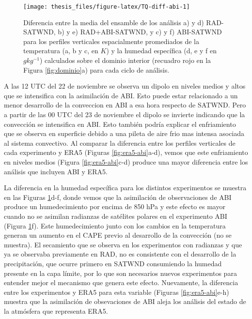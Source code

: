 \documentclass[12pt,oneside,a4paper]{reedthesis}
\begin{document}
\begin{figure}

\texttt{[image: thesis\_files/figure-latex/TQ-diff-abi-1]} \hfill{}

\caption{Diferencia entre la media del ensamble de los análisis a) y d) RAD-SATWND, b) y e) RAD+ABI-SATWND, y c) y f) ABI-SATWND para los perfiles verticales espacialmente promediados de la temperatura (a, b y c, en \(K\)) y la humedad específica (d, e y f en \(gkg^{-1}\)) calculados sobre el dominio interior (recuadro rojo en la Figura \ref{fig:dominio}a) para cada ciclo de análisis.}\label{fig:TQ-diff-abi}
\end{figure}
A las 12 UTC del 22 de noviembre se observa un dipolo en niveles medios y altos que se intensifica con la asimilación de ABI. Esto puede estar relacionado a un menor desarrollo de la conveccion en ABI a esa hora respecto de SATWND. Pero a partir de las 00 UTC del 23 de noviembre el dipolo se invierte indicando que la convección se intensifica en ABI. Esto también podría explicar el enfriamiento que se observa en superficie debido a una pileta de aire frio mas intensa asociada al sistema convectivo.
Al comparar la diferencia entre los perfiles verticales de cada experimento y ERA5 (Figuras \ref{fig:era5-abi}a-d), vemos que este enfriamiento en niveles medios (Figura \ref{fig:era5-abi}c-d) produce una mayor diferencia entre los análisis que incluyen ABI y ERA5.

La diferencia en la humedad específica para los distintos experimentos se muestra en las Figuras \ref{fig:TQ-diff-abi}d-f, donde vemos que la asimilación de observaciones de ABI produce un humedecimiento por encima de 850 hPa y este efecto es mayor cuando no se asimilan radianzas de satélites polares en el experimento ABI (Figura \ref{fig:TQ-diff-abi}f). Este humedecimiento junto con los cambios en la temperatura generan un aumento en el CAPE previo al desarrollo de la convección (no se muestra). El secamiento que se observa en los experimentos con radianzas y que ya se observaba previamente en RAD, no es consistente con el desarrollo de la precipitación, que ocurre primero en SATWND consumiendo la humedad presente en la capa límite, por lo que son necesarios nuevos experimentos para entender mejor el mecanismo que genera este efecto. Nuevamente, la diferencia entre los experimentos y ERA5 para esta variable (Figuras \ref{fig:era5-abi}e-h) muestra que la asimilación de obsevaciones de ABI aleja los análisis del estado de la atmósfera que representa ERA5.
\end{document}
